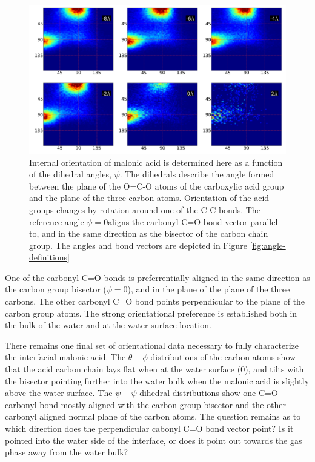 \begin{figure}[h!]
	\begin{center}
		\includegraphics[scale=1.0]{images/malonic-angles/carboxylic-psi-psi.png}
		\caption{Internal orientation of malonic acid is determined here as a function of the dihedral angles, $\psi$. The dihedrals describe the angle formed between the plane of the O=C-O atoms of the carboxylic acid group  and the plane of the three carbon atoms. Orientation of the acid groups changes by rotation around one of the C-C bonds. The reference angle $\psi=0$\textdegree aligns the carbonyl C=O bond vector parallel to, and in the same direction as the bisector of the carbon chain group. The angles and bond vectors are depicted in Figure \ref{fig:angle-definitions}}
		\label{fig:carboxylic-psi-psi}
	\end{center}
\end{figure}

One of the carbonyl C=O bonds is preferrentially aligned in the same direction as the carbon group bisector ($\psi=0$\textdegree), and in the plane of the plane of the three carbons. The other carbonyl C=O bond points perpendicular to the plane of the carbon group atoms. The strong orientational preference is established both in the bulk of the water and at the water surface location.

There remains one final set of orientational data necessary to fully characterize the interfacial malonic acid. The $\theta-\phi$ distributions of the carbon atoms show that the acid carbon chain lays flat when at the water surface (0\angs), and tilts with the bisector pointing further into the water bulk when the malonic acid is slightly above the water surface. The $\psi-\psi$ dihedral distributions show one C=O carbonyl bond mostly aligned with the carbon group bisector and the other carbonyl aligned normal plane of the carbon atoms. The question remains as to which direction does the perpendicular cabonyl C=O bond vector point? Is it pointed into the water side of the interface, or does it point out towards the gas phase away from the water bulk?

